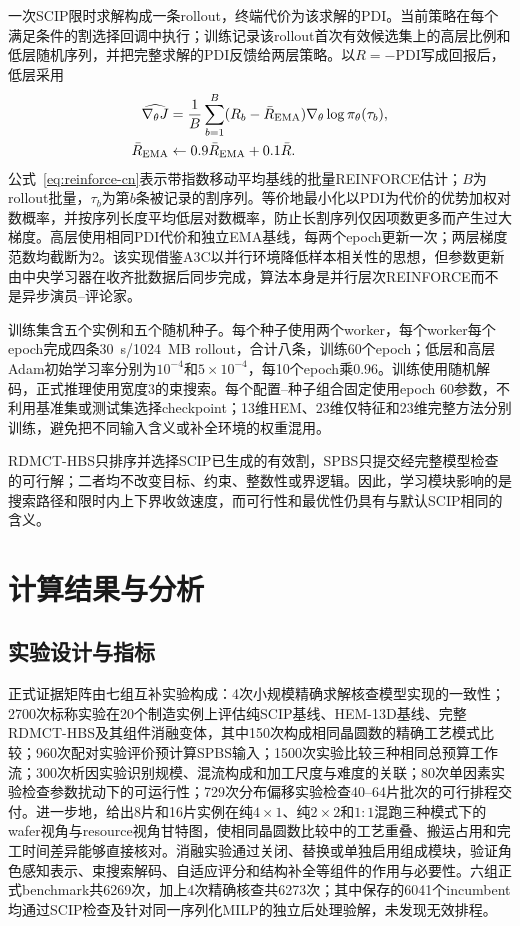 \documentclass[final,5p,times,twocolumn]{elsarticle}
\newcommand{\method}{RDMCT-HBS}
\newcommand{\pdi}{\mathrm{PDI}}
\begin{document}
一次SCIP限时求解构成一条rollout，终端代价为该求解的PDI。当前策略在每个满足条件的割选择回调中执行；训练记录该rollout首次有效候选集上的高层比例和低层随机序列，并把完整求解的PDI反馈给两层策略。以$R=-\pdi$写成回报后，低层采用
\begin{equation}
\begin{aligned}
\widehat{\nabla_\theta J}
&=\frac1B\sum_{b=1}^B(R_b-\bar R_{\rm EMA})
\nabla_\theta\log\pi_\theta(\tau_b),\\
\bar R_{\rm EMA}&\leftarrow0.9\bar R_{\rm EMA}+0.1\bar R.
\end{aligned}
\label{eq:reinforce-cn}
\end{equation}
公式~\eqref{eq:reinforce-cn}表示带指数移动平均基线的批量REINFORCE估计；$B$为rollout批量，$\tau_b$为第$b$条被记录的割序列。等价地最小化以PDI为代价的优势加权对数概率，并按序列长度平均低层对数概率，防止长割序列仅因项数更多而产生过大梯度。高层使用相同PDI代价和独立EMA基线，每两个epoch更新一次；两层梯度范数均截断为2。该实现借鉴A3C以并行环境降低样本相关性的思想，但参数更新由中央学习器在收齐批数据后同步完成，算法本身是并行层次REINFORCE而不是异步演员--评论家\citep{williams1992reinforce,mnih2016a3c}。

训练集含五个实例和五个随机种子。每个种子使用两个worker，每个worker每个epoch完成四条30~s/1024~MB rollout，合计八条，训练60个epoch；低层和高层Adam初始学习率分别为$10^{-4}$和$5\times10^{-4}$，每10个epoch乘0.96。训练使用随机解码，正式推理使用宽度3的束搜索。每个配置--种子组合固定使用epoch 60参数，不利用基准集或测试集选择checkpoint；13维HEM、23维仅特征和23维完整方法分别训练，避免把不同输入含义或补全环境的权重混用。

\method{}只排序并选择SCIP已生成的有效割，SPBS只提交经完整模型检查的可行解；二者均不改变目标、约束、整数性或界逻辑。因此，学习模块影响的是搜索路径和限时内上下界收敛速度，而可行性和最优性仍具有与默认SCIP相同的含义。

\section{计算结果与分析}

\subsection{实验设计与指标}

正式证据矩阵由七组互补实验构成：4次小规模精确求解核查模型实现的一致性；2700次标称实验在20个制造实例上评估纯SCIP基线、HEM-13D基线、完整RDMCT-HBS及其组件消融变体，其中150次构成相同晶圆数的精确工艺模式比较；960次配对实验评价预计算SPBS输入；1500次实验比较三种相同总预算工作流；300次析因实验识别规模、混流构成和加工尺度与难度的关联；80次单因素实验检查参数扰动下的可运行性；729次分布偏移实验检查40--64片批次的可行排程交付。进一步地，给出8片和16片实例在纯$4\times1$、纯$2\times2$和$1{:}1$混跑三种模式下的wafer视角与resource视角甘特图，使相同晶圆数比较中的工艺重叠、搬运占用和完工时间差异能够直接核对。消融实验通过关闭、替换或单独启用组成模块，验证角色感知表示、束搜索解码、自适应评分和结构补全等组件的作用与必要性。六组正式benchmark共6269次，加上4次精确核查共6273次；其中保存的6041个incumbent均通过SCIP检查及针对同一序列化MILP的独立后处理验解，未发现无效排程。
\end{document}

